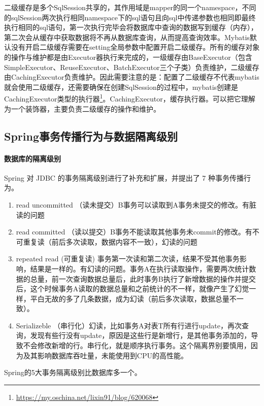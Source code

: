 \documentclass[../../../interview-questions.tex]{subfiles}
\begin{document}
二级缓存是多个SqlSession共享的，其作用域是mapper的同一个namespace，不同的sqlSession两次执行相同namespace下的sql语句且向sql中传递参数也相同即最终执行相同的sql语句，第一次执行完毕会将数据库中查询的数据写到缓存（内存），第二次会从缓存中获取数据将不再从数据库查询，从而提高查询效率。Mybatis默认没有开启二级缓存需要在setting全局参数中配置开启二级缓存。所有的缓存对象的操作与维护都是由Executor器执行来完成的，一级缓存由BaseExecutor（包含SimpleExecutor、ReuseExecutor、BatchExecutor三个子类）负责维护，二级缓存由CachingExecutor负责维护。因此需要注意的是：配置了二级缓存不代表mybatis就会使用二级缓存，还需要确保在创建SqlSession的过程中，mybatis创建是CachingExecutor类型的执行器\footnote{\url{https://my.oschina.net/lixin91/blog/620068}}。CachingExecutor，缓存执行器。可以把它理解为一个装饰器，主要负责二级缓存的操作和维护。

\subsection{Spring事务传播行为与数据隔离级别}

\paragraph{数据库的隔离级别}


Spring 对 JDBC 的事务隔离级别进行了补充和扩展，并提出了 7 种事务传播行为。

\begin{enumerate}
\item {read uncommitted （读未提交）B事务可以读取到A事务未提交的修改。有脏读的问题}
\item{read committed （读以提交）B事务不能读取其他事务未commit的修改。有不可重复读（前后多次读取，数据内容不一致），幻读的问题}
\item{repeated read (可重复读) 事务第一次读和第二次读，结果不受其他事务影响，结果是一样的。有幻读的问题。事务A在执行读取操作，需要两次统计数据的总量，前一次查询数据总量后，此时事务B执行了新增数据的操作并提交后，这个时候事务A读取的数据总量和之前统计的不一样，就像产生了幻觉一样，平白无故的多了几条数据，成为幻读（前后多次读取，数据总量不一致）。}
\item{Serializeble （串行化）幻读，比如事务A对表T所有行进行update，再次查询，发现有些行没有update，原因是这些行是新增行，是其他事务添加的，导致不会修改新增的行。串行化，就是顺序执行事务。这个隔离界别要慎用，因为及其影响数据库吞吐量，未能使用到CPU的高性能。}
\end{enumerate}

Spring的5大事务隔离级别比数据库多一个。
\end{document}
